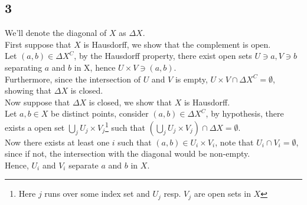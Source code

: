 \documentclass[11pt, a4paper]{article}
\begin{document}
\subsection*{3}
We'll denote the diagonal of $X$  as $\Delta X$.\\
First suppose that $X$ is Hausdorff, we show that the complement is open.\\
Let $( a,b ) \in \Delta X^{C}$, by the Hausdorff property, there exist open sets  $U\ni a, V \ni b$ separating $a$ and $b$ in X, hence $U\times V\ni ( a,b) $.\\
Furthermore, since the intersection of $U$ and $V$ is empty, $U\times V \cap \Delta X ^{C} = \emptyset$, showing that $\Delta X$ is closed.\\

Now suppose that $\Delta X$ is closed, we show that $X$ is Hausdorff.\\
Let $ a,b \in X$ be distinct points, consider $ ( a,b) \in \Delta X^{C}$, by hypothesis, there exists a open set $ \bigcup_{j} U_j\times V_j $\footnote{ Here $j$ runs over some index set and $U_j$ resp. $ V_j$ are open sets in $X$ } such that $ \left( \bigcup_j U_j\times V_j \right)\cap \Delta X = \emptyset$.\\
Now there exists at least one $i $ such that $( a,b) \in U_i \times V_i$, note that $U_i \cap V_i= \emptyset$, since if not, the intersection with the diagonal would be non-empty.\\
Hence, $U_i$  and $V_i$  separate $a$ and $b$ in $X$.
\end{document}
